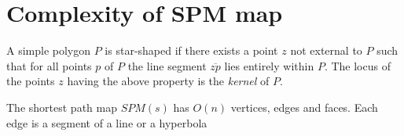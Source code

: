 \section{Complexity of SPM map}

\begin{mydef}\cite{PreparataS85}
	\label{star-shaped}
	A simple polygon $P$ is star-shaped if there exists a point $z$ not external
	to $P$ such that for all points $p$ of $P$ the line segment $\overline{zp}$
	lies entirely within $P$. The locus of the points $z$ having the above
	property is the \emph{kernel} of $P$.
\end{mydef}

\begin{Lemma}[Lemma 3.2]
	\label{lemma:3.2}
	The shortest path map $SPM(s)$ has $O(n)$ vertices, edges and faces. Each
	edge is a segment of a line or a hyperbola
\end{Lemma}
